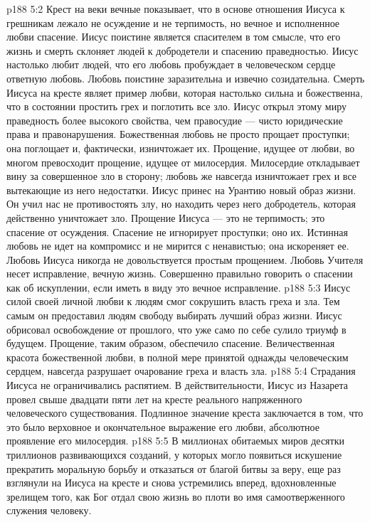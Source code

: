 \vs p188 5:2 Крест на веки вечные показывает, что в основе отношения Иисуса к грешникам лежало не осуждение и не терпимость, но вечное и исполненное любви спасение. Иисус поистине является спасителем в том смысле, что его жизнь и смерть склоняет людей к добродетели и спасению праведностью. Иисус настолько любит людей, что его любовь пробуждает в человеческом сердце ответную любовь. Любовь поистине заразительна и извечно созидательна. Смерть Иисуса на кресте являет пример любви, которая настолько сильна и божественна, что в состоянии простить грех и поглотить все зло. Иисус открыл этому миру праведность более высокого свойства, чем правосудие --- чисто юридические права и правонарушения. Божественная любовь не просто прощает проступки; она поглощает и, фактически, изничтожает их. Прощение, идущее от любви, во многом превосходит прощение, идущее от милосердия. Милосердие откладывает вину за совершенное зло в сторону; любовь же навсегда изничтожает грех и все вытекающие из него недостатки. Иисус принес на Урантию новый образ жизни. Он учил нас не противостоять злу, но находить через него добродетель, которая действенно уничтожает зло. Прощение Иисуса --- это не терпимость; это спасение от осуждения. Спасение не игнорирует проступки; оно  их. Истинная любовь не идет на компромисс и не мирится с ненавистью; она искореняет ее. Любовь Иисуса никогда не довольствуется простым прощением. Любовь Учителя несет исправление, вечную жизнь. Совершенно правильно говорить о спасении как об искуплении, если иметь в виду это вечное исправление.
\vs p188 5:3 Иисус силой своей личной любви к людям смог сокрушить власть греха и зла. Тем самым он предоставил людям свободу выбирать лучший образ жизни. Иисус обрисовал освобождение от прошлого, что уже само по себе сулило триумф в будущем. Прощение, таким образом, обеспечило спасение. Величественная красота божественной любви, в полной мере принятой однажды человеческим сердцем, навсегда разрушает очарование греха и власть зла.
\vs p188 5:4 \pc Страдания Иисуса не ограничивались распятием. В действительности, Иисус из Назарета провел свыше двадцати пяти лет на кресте реального напряженного человеческого существования. Подлинное значение креста заключается в том, что это было верховное и окончательное выражение его любви, абсолютное проявление его милосердия.
\vs p188 5:5 \pc В миллионах обитаемых миров десятки триллионов развивающихся созданий, у которых могло появиться искушение прекратить моральную борьбу и отказаться от благой битвы за веру, еще раз взглянули на Иисуса на кресте и снова устремились вперед, вдохновленные зрелищем того, как Бог отдал свою жизнь во плоти во имя самоотверженного служения человеку.
